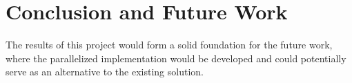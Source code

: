 \documentclass[main.tex]{subfiles}
\begin{document}
\chapter{Conclusion and Future Work}
\label{chap:conclusion_and_future_work}

The results of this project would form a solid foundation for
the future work, where the parallelized implementation would be developed and
could potentially serve as an alternative to the existing solution.

\biblio
\end{document}
